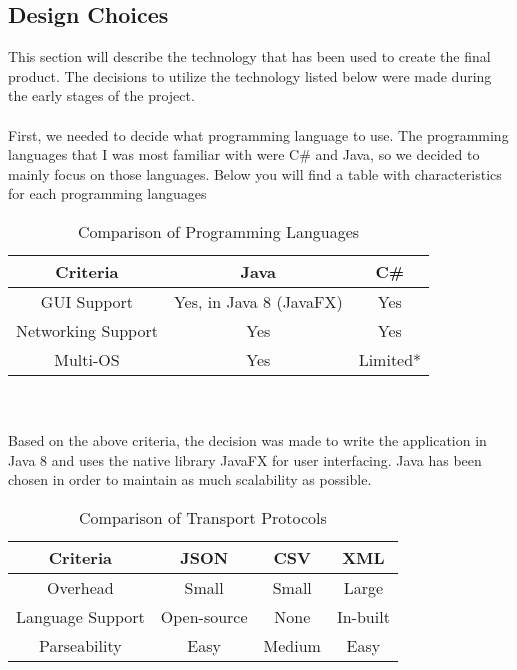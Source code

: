 \documentclass[11pt,a4paper]{article}
\begin{document}
\subsection{Design Choices}
This section will describe the technology that has been used to create the final product. The decisions to utilize the technology listed below were made during the early stages of the project.\\\\
First, we needed to decide what programming language to use. The programming languages that I was most familiar with were C\# and Java, so we decided to mainly focus on those languages. Below you will find a table with characteristics for each programming languages
\begin{table}[h]
	\begin{center}
		\begin{tabular}{| c || c | c |}
			\hline
			Criteria & Java & C\# \\ \hline
			GUI Support & Yes, in Java 8 (JavaFX) & Yes \\ \hline
			Networking Support & Yes & Yes \\ \hline
			Multi-OS & Yes & Limited* \\ \hline
		\end{tabular}
		\caption{Comparison of Programming Languages}
	\end{center}
\end{table}\\\\
Based on the above criteria, the decision was made to write the application in Java 8 and uses the native library JavaFX for user interfacing. Java has been chosen in order to maintain as much scalability as possible.
\begin{table}[h]
	\begin{center}
		\begin{tabular}{| c || c | c | c |}
			\hline
			Criteria & JSON & CSV & XML \\ \hline
			Overhead & Small & Small & Large \\ \hline
			Language Support & Open-source & None & In-built \\ \hline
			Parseability & Easy & Medium & Easy \\ \hline
		\end{tabular}
		\caption{Comparison of Transport Protocols}
	\end{center}
\end{table}\\\\
\end{document}
